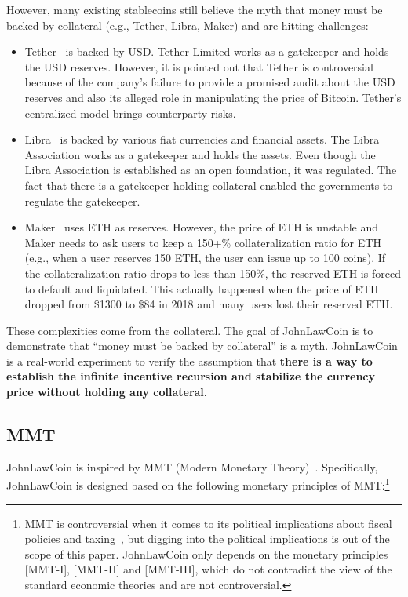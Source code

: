 \documentclass[dvipdfmx,a4paper]{article}
\begin{document}
However, many existing stablecoins still believe the myth that money must be backed by collateral (e.g., Tether, Libra, Maker) and are hitting challenges:

\begin{itemize}
\item Tether~\cite{tether} is backed by USD. Tether Limited works as a gatekeeper and holds the USD reserves. However, it is pointed out that Tether is controversial because of the company's failure to provide a promised audit about the USD reserves and also its alleged role in manipulating the price of Bitcoin. Tether's centralized model brings counterparty risks.
\item Libra~\cite{libra} is backed by various fiat currencies and financial assets. The Libra Association works as a gatekeeper and holds the assets. Even though the Libra Association is established as an open foundation, it was regulated. The fact that there is a gatekeeper holding collateral enabled the governments to regulate the gatekeeper.
\item Maker~\cite{makerdao} uses ETH as reserves. However, the price of ETH is unstable and Maker needs to ask users to keep a 150+\% collateralization ratio for ETH (e.g., when a user reserves 150 ETH, the user can issue up to 100 coins). If the collateralization ratio drops to less than 150\%, the reserved ETH is forced to default and liquidated. This actually happened when the price of ETH dropped from \$1300 to \$84 in 2018 and many users lost their reserved ETH.
\end{itemize}

These complexities come from the collateral. The goal of JohnLawCoin is to demonstrate that ``money must be backed by collateral'' is a myth. JohnLawCoin is a real-world experiment to verify the assumption that \textbf{there is a way to establish the infinite incentive recursion and stabilize the currency price without holding any collateral}.

\subsection{MMT}

JohnLawCoin is inspired by MMT (Modern Monetary Theory)~\cite{kelton2020deficit,mmt2016wray}. Specifically, JohnLawCoin is designed based on the following monetary principles of MMT:\footnote{MMT is controversial when it comes to its political implications about fiscal policies and taxing~\cite{palley2015money}, but digging into the political implications is out of the scope of this paper. JohnLawCoin only depends on the monetary principles [MMT-I], [MMT-II] and [MMT-III], which do not contradict the view of the standard economic theories and are not controversial.}
\end{document}
